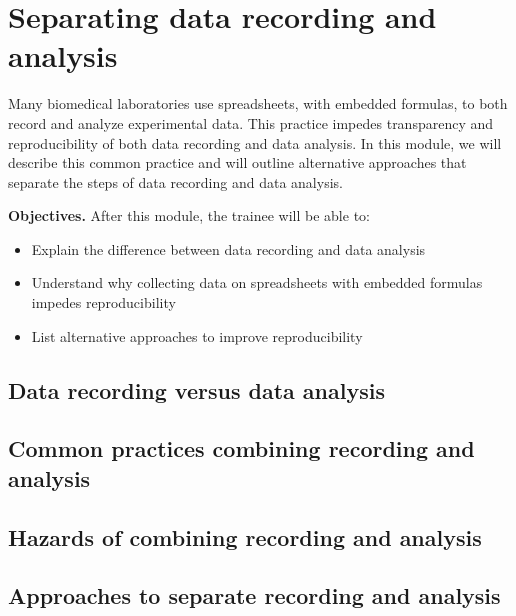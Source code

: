 \documentclass[]{tufte-book}
\providecommand{\tightlist}{%
  \setlength{\itemsep}{0pt}\setlength{\parskip}{0pt}}
\begin{document}
\hypertarget{separating-data-recording-and-analysis-5}{%
\section{Separating data recording and analysis}\label{separating-data-recording-and-analysis-5}}

Many biomedical laboratories use spreadsheets, with embedded formulas, to both
record and analyze experimental data. This practice impedes transparency and
reproducibility of both data recording and data analysis. In this module, we
will describe this common practice and will outline alternative approaches that
separate the steps of data recording and data analysis.

\textbf{Objectives.} After this module, the trainee will be able to:

\begin{itemize}
\tightlist
\item
  Explain the difference between data recording and data analysis
\item
  Understand why collecting data on spreadsheets with embedded formulas impedes
  reproducibility
\item
  List alternative approaches to improve reproducibility
\end{itemize}

\hypertarget{data-recording-versus-data-analysis-5}{%
\subsection{Data recording versus data analysis}\label{data-recording-versus-data-analysis-5}}

\hypertarget{common-practices-combining-recording-and-analysis-5}{%
\subsection{Common practices combining recording and analysis}\label{common-practices-combining-recording-and-analysis-5}}

\hypertarget{hazards-of-combining-recording-and-analysis-5}{%
\subsection{Hazards of combining recording and analysis}\label{hazards-of-combining-recording-and-analysis-5}}

\hypertarget{approaches-to-separate-recording-and-analysis-5}{%
\subsection{Approaches to separate recording and analysis}\label{approaches-to-separate-recording-and-analysis-5}}
\end{document}
